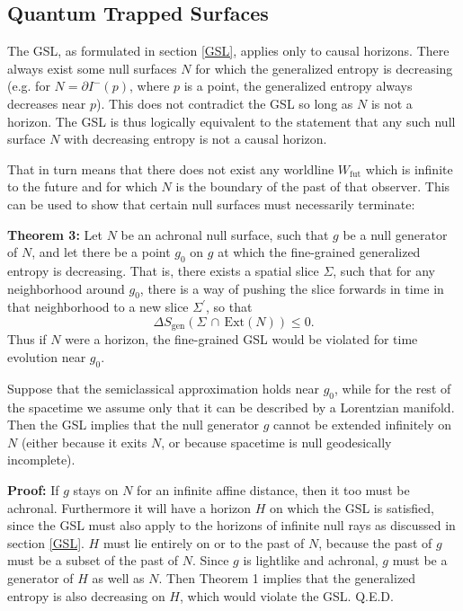\documentclass{article}
\begin{document}
\subsection{Quantum Trapped Surfaces}

The GSL, as formulated in section \ref{GSL}, applies only to causal horizons.  There always exist some null surfaces $N$ for which the generalized entropy is decreasing (e.g. for $N = \partial I^-(p)$, where $p$ is a point, the generalized entropy always decreases near $p$).  This does not contradict the GSL so long as $N$ is not a horizon.  The GSL is thus logically equivalent to the statement that any such null surface $N$ with decreasing entropy is not a causal horizon. 

That in turn means that there does not exist any worldline $W_\mathrm{fut}$ which is infinite to the future and for which $N$ is the boundary of the past of that observer.  This can be used to show that certain null surfaces must necessarily terminate:

\textbf{Theorem 3:}  Let $N$ be an achronal null surface, such that $g$ be a null generator of $N$, and let there be a point $g_0$ on $g$ at which the fine-grained generalized entropy is decreasing.  That is, there exists a spatial slice $\Sigma$, such that for any neighborhood around $g_0$, there is a way of pushing the slice forwards in time in that neighborhood to a new slice $\Sigma^\prime$, so that
\begin{equation}
\Delta S_\mathrm{gen}(\Sigma\,\cap\,\mathrm{Ext}(N)) \le 0.
\end{equation}
Thus if $N$ were a horizon, the fine-grained GSL would be violated for time evolution near $g_0$.

Suppose that the semiclassical approximation holds near $g_0$, while for the rest of the spacetime we assume only that it can be described by a Lorentzian manifold.  Then the GSL implies that the null generator $g$ cannot be extended infinitely on $N$ (either because it exits $N$, or because spacetime is null geodesically incomplete).

\textbf{Proof:} If $g$ stays on $N$ for an infinite affine distance, then it too must be achronal.  Furthermore it will have a horizon $H$ on which the GSL is satisfied, since the GSL must also apply to the horizons of infinite null rays as discussed in section \ref{GSL}.  $H$ must lie entirely on or to the past of $N$, because the past of $g$ must be a subset of the past of $N$.  Since $g$ is lightlike and achronal, $g$ must be a generator of $H$ as well as $N$.  Then Theorem 1 implies that the generalized entropy is also decreasing on $H$, which would violate the GSL.  Q.E.D.
\end{document}
